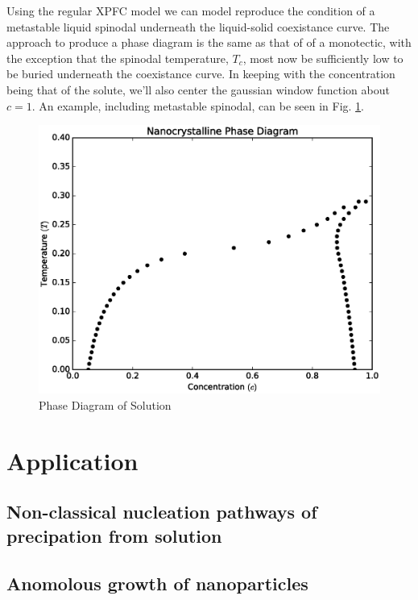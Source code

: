 \documentclass[showkeys, prb, reprint]{revtex4-1}
\begin{document}
Using the regular XPFC model we can model reproduce the condition of a metastable liquid spinodal underneath the liquid-solid coexistance curve. The approach to produce a phase diagram is the same as that of of a monotectic, with the exception that the spinodal temperature, $T_c$, most now be sufficiently low to be buried underneath the coexistance curve. In keeping with the concentration being that of the solute, we'll also center the gaussian window function about $c = 1$. An example, including metastable spinodal, can be seen in Fig. \ref{precip}.

\begin{figure}
	\includegraphics[scale=0.3]{solution.eps}
	\caption{\label{precip} Phase Diagram of Solution}
\end{figure}

\section{Application}



\subsection{Non-classical nucleation pathways of precipation from solution}

\subsection{Anomolous growth of nanoparticles}


\end{document}
